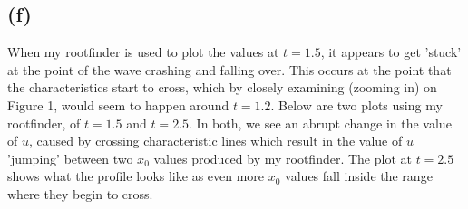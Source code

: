 \documentclass{article}
\begin{document}
\subsection*{(f)}
When my rootfinder is used to plot the values at $t=1.5$, it appears to get 'stuck' at the point of the wave crashing and falling over. This occurs at the point that the characteristics start to cross, which by closely examining (zooming in) on Figure 1, would seem to happen around $t = 1.2$. Below are two plots using my rootfinder, of $t = 1.5$ and $t = 2.5$. In both, we see an abrupt change in the value of $u$, caused by crossing characteristic lines which result in the value of $u$ 'jumping' between two $x_0$ values produced by my rootfinder. The plot at $t=2.5$ shows what the profile looks like as even more $x_0$ values fall inside the range where they begin to cross.
\end{document}
